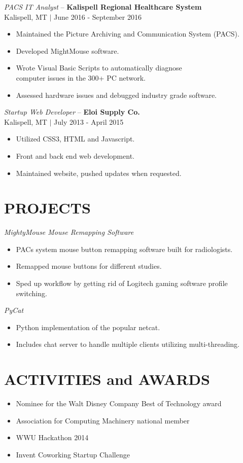 \documentclass[line,margin]{res}
\begin{document}
\begin{resume}
\begin{itemize}
	\end{itemize}
	{\sl PACS IT Analyst} -- {\bf Kalispell Regional Healthcare System} \\
	{\footnotesize Kalispell, MT $|$ June 2016 - September 2016}\\
	\begin{itemize} \itemsep -2pt
		\item Maintained the Picture Archiving and Communication System (PACS).
		\item Developed MightMouse software.
		\item Wrote Visual Basic Scripts to automatically diagnose \\computer issues in the 300+ PC network.
		\item Assessed hardware issues and debugged industry grade software.
	\end{itemize}
	{\sl Startup Web Developer} -- {\bf Eloi Supply Co.} \\
	{\footnotesize Kalispell, MT $|$  July 2013 - April 2015}\\
	\begin{itemize} \itemsep -2pt
		\item Utilized CSS3, HTML and Javascript.
		\item Front and back end web development.
		\item Maintained website, pushed updates when requested.
	\end{itemize}
	\section{PROJECTS}
		{\sl MightyMouse Mouse Remapping Software}
\begin{itemize}\itemsep -2pt
		\item PACs system mouse button remapping software built for radiologists.
		\item Remapped mouse buttons for different studies.
		\item Sped up workflow by getting rid of Logitech gaming software profile switching.
	\end{itemize}
	{\sl PyCat}
	\begin{itemize}\itemsep -2pt
		\item Python implementation of the popular netcat.
		\item Includes chat server to handle multiple clients utilizing multi-threading.
	\end{itemize}



\section{ACTIVITIES and AWARDS}
	\begin{itemize} \itemsep -3pt
	\item Nominee for the Walt Disney Company Best of Technology award
	\item Association for Computing Machinery national member
	\item WWU Hackathon 2014
	\item Invent Coworking Startup Challenge
	\end{itemize}

\end{resume}
\end{document}
